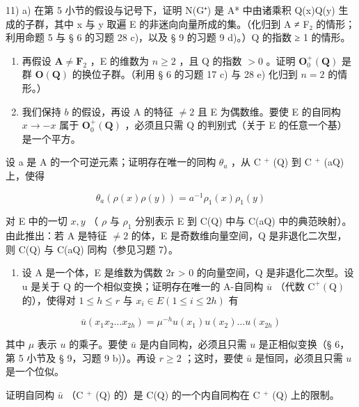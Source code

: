 11) a) 在第 5 小节的假设与记号下，证明 N(G⁺) 是 A* 中由诸乘积 Q(x)Q(y) 生成的子群，其中 x 与 y 取遍 E 的非迷向向量所成的集。（化归到 A ≠ F₂ 的情形；利用命题 5 与 § 6 的习题 28 c)，以及 § 9 的习题 9 d)。）Q 的指数 ≥ 1 的情形。

\begin{enumerate}
\def\labelenumi{\alph{enumi})}
\setcounter{enumi}{1}
\item
  再假设 \(\mathbf{A} \neq \mathbf{F}_2\) ，E 的维数为 \(n \geqslant 2\) ，且 Q 的指数 \(>0\) 。证明 \(\mathbf{O}_0^+(\mathbf{Q})\) 是群 \(\mathbf{O}(\mathbf{Q})\) 的换位子群。（利用 § 6 的习题 17 c) 与 28 e) 化归到 \(n = 2\) 的情形。）
\item
  我们保持 \(b\) 的假设，再设 A 的特征 \(\neq 2\) 且 E 为偶数维。要使 E 的自同构 \(x \to -x\) 属于 \(\mathbf{O}_0^+(\mathbf{Q})\) ，必须且只需 Q 的判别式（关于 E 的任意一个基）是一个平方。
\end{enumerate}

设 a 是 A 的一个可逆元素；证明存在唯一的同构 \(\theta_{a}\) ，从 C \(^{+}\) (Q) 到 C \(^{+}\) (aQ) 上，使得

\[
\theta_ {a} (\rho (x) \rho (y)) = a ^ {- 1} \rho_ {1} (x) \rho_ {1} (y)
\]

对 E 中的一切 \(x, y\) （ \(\rho\) 与 \(\rho_{1}\) 分别表示 E 到 C(Q) 中与 C(aQ) 中的典范映射）。由此推出：若 A 是特征 \(\neq 2\) 的体，E 是奇数维向量空间，Q 是非退化二次型，则 C(Q) 与 C(aQ) 同构（参见习题 7）。

\begin{enumerate}
\def\labelenumi{\alph{enumi})}
\setcounter{enumi}{1}
\tightlist
\item
  设 A 是一个体，E 是维数为偶数 2r \textgreater{} 0 的向量空间，Q 是非退化二次型。设 u 是关于 Q 的一个相似变换；证明存在唯一的 A-自同构 \(\overline{u}\) （代数 \(\mathrm{C}^{+}(\mathrm{Q})\) 的），使得对 \(1 \leqslant h \leqslant r\) 与 \(x_{i} \in E (1 \leqslant i \leqslant 2h)\) 有
\end{enumerate}

\[
\overline {{{u}}} (x _ {1} x _ {2} \dots x _ {2 h}) = \mu^ {- h} u (x _ {1}) u (x _ {2}) \dots u (x _ {2 h})
\]

其中 \(\mu\) 表示 \(u\) 的乘子。要使 \(\bar{u}\) 是内自同构，必须且只需 \(u\) 是正相似变换（§ 6，第 5 小节及 § 9，习题 9 b)）。再设 \(r \geqslant 2\) ；这时，要使 \(\bar{u}\) 是恒同，必须且只需 \(u\) 是一个位似。

证明自同构 \(\bar{u}\) （C \(^{+}\) (Q) 的）是 C(Q) 的一个内自同构在 C \(^{+}\) (Q) 上的限制。

